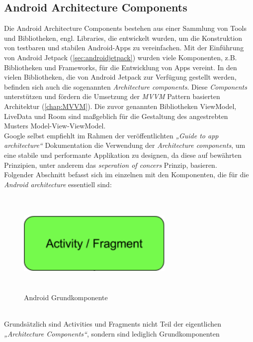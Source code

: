 \subsection{Android Architecture Components}
\label{chap:AAC}
Die Android Architecture Components bestehen aus einer Sammlung von Tools und Bibliotheken, engl. Libraries, die entwickelt wurden, um die 
Konstruktion von testbaren und stabilen Android-Apps zu vereinfachen. Mit der Einführung von Android Jetpack (\ref{sec:androidjetpack}) wurden 
viele Komponenten, z.B. Bibliotheken und Frameworks, für die Entwicklung von Apps vereint. In den vielen Bibliotheken, die von Android Jetpack 
zur Verfügung gestellt werden, befinden sich auch die sogenannten \textit{Architecture components}. Diese \textit{Components} unterstützen und 
fördern die Umsetzung der \textit{MVVM} Pattern basierten Architektur (\ref{chap:MVVM}). Die zuvor genannten Bibliotheken ViewModel, LiveData und Room 
sind maßgeblich für die Gestaltung des angestrebten Musters Model-View-ViewModel. 
\\ 
Google selbst empfiehlt im Rahmen der veröffentlichten \textit{„Guide to app architecture“} Dokumentation die Verwendung der \textit{Architecture components}, um 
eine stabile und performante Applikation zu designen, da diese auf bewährten Prinzipien, unter anderem das \textit{seperation of concers} Prinzip, basieren.
\\ 
\linebreak
Folgender Abschnitt befasst sich im einzelnen mit den Komponenten, die für die \textit{Android architecture} essentiell sind:
\begin{figure}[hbt!]
    \centering
    \includegraphics[width=7.5cm,height=5cm,keepaspectratio]{2GrundlagenX/Bilder/activityComp.png}
    \caption{Android Grundkomponente \cite{aac.2020j}}
    \label{pic:activity}
\end{figure}
\\
Grundsätzlich sind Activities und Fragments nicht Teil der eigentlichen \textit{„Architecture Components“}, sondern sind lediglich Grundkomponenten 
